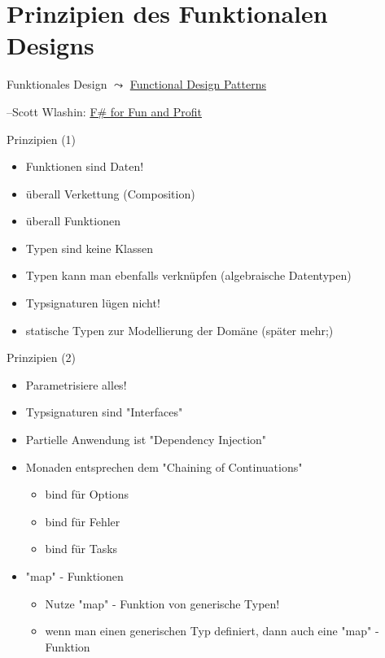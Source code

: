 \documentclass[t]{beamer}
\begin{document}
\section{Prinzipien des Funktionalen Designs }
\label{sec:orgf4a6d63}
\begin{frame}[label={sec:orga757de2}]{Funktionales Design}
\(\leadsto\) \href{./3.1 Functional Design Patterns.pdf}{Functional Design Patterns}

\null\hfill--Scott Wlashin: \href{https://fsharpforfunandprofit.com/rop/}{F\# for Fun and Profit}
\end{frame}

\begin{frame}[label={sec:orgb03e518}]{Prinzipien (1)}
\begin{itemize}
\item Funktionen sind Daten!
\item überall Verkettung (Composition)
\item überall Funktionen
\item Typen sind keine Klassen
\item Typen kann man ebenfalls verknüpfen (algebraische Datentypen)
\item Typsignaturen lügen nicht!
\item statische Typen zur Modellierung der Domäne (später mehr;)
\end{itemize}
\end{frame}

\begin{frame}[label={sec:orgb30ec5c}]{Prinzipien (2)}
\begin{itemize}
\item Parametrisiere alles!
\item Typsignaturen sind "Interfaces"
\item Partielle Anwendung ist "Dependency Injection"
\item Monaden entsprechen dem "Chaining of Continuations"
\begin{itemize}
\item bind für Options
\item bind für Fehler
\item bind für Tasks
\end{itemize}
\item "map" - Funktionen
\begin{itemize}
\item Nutze "map" - Funktion von generische Typen!
\item wenn man einen generischen Typ definiert, dann auch eine "map" - Funktion
\end{itemize}
\end{itemize}
\end{frame}
\end{document}
